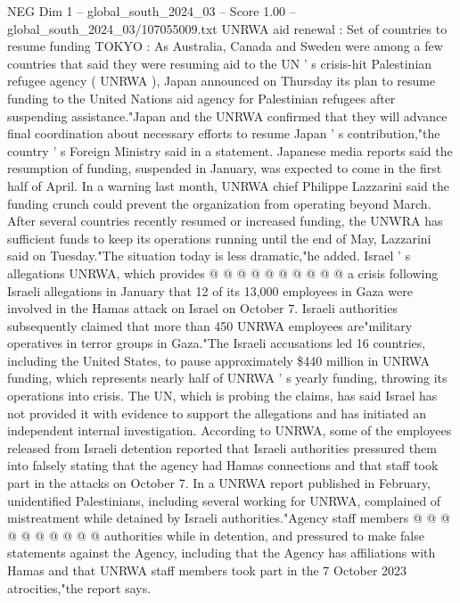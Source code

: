 \begin{textsample}{NEG Dim 1 – global\_south\_2024\_03 – Score 1.00 – global\_south\_2024\_03/107055009.txt}  \label{ex:f1_neg_115}
UNRWA aid renewal : Set of countries to resume funding TOKYO : As Australia, Canada and Sweden were among a few countries that said they were resuming aid to the UN ' s crisis-hit Palestinian refugee agency ( UNRWA ), Japan announced on Thursday its plan to resume funding to the United Nations aid agency for Palestinian refugees after suspending assistance."Japan and the UNRWA confirmed that they will advance final coordination about necessary efforts to resume Japan ' s contribution,"the country ' s Foreign Ministry said in a statement.
Japanese media reports said the resumption of funding, suspended in January, was expected to come in the first half of April.
In a warning last month, UNRWA chief Philippe Lazzarini said the funding crunch could prevent the organization from operating beyond March.
After several countries recently resumed or increased funding, the UNWRA has sufficient funds to keep its operations running until the end of May, Lazzarini said on Tuesday."The situation today is less dramatic,"he added.
Israel ' s allegations UNRWA, which provides @ @ @ @ @ @ @ @ @ @ a crisis following Israeli allegations in January that 12 of its 13,000 employees in Gaza were involved in the Hamas attack on Israel on October 7.
Israeli authorities subsequently claimed that more than 450 UNRWA employees are"military operatives in terror groups in Gaza."The Israeli accusations led 16 countries, including the United States, to pause approximately \$440 million in UNRWA funding, which represents nearly half of UNRWA ' s yearly funding, throwing its operations into crisis.
The UN, which is probing the claims, has said Israel has not provided it with evidence to support the allegations and has initiated an independent internal investigation.
According to UNRWA, some of the employees released from Israeli detention reported that Israeli authorities pressured them into falsely stating that the agency had Hamas connections and that staff took part in the attacks on October 7.
In a UNRWA report published in February, unidentified Palestinians, including several working for UNRWA, complained of mistreatment while detained by Israeli authorities."Agency staff members @ @ @ @ @ @ @ @ @ @ authorities while in detention, and pressured to make false statements against the Agency, including that the Agency has affiliations with Hamas and that UNRWA staff members took part in the 7 October 2023 atrocities,"the report says.

\end{textsample}
